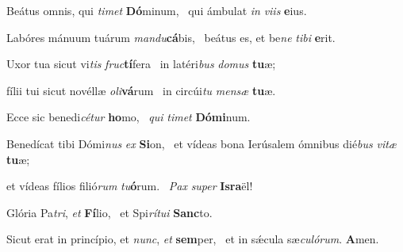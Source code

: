\item Beátus omnis, qui \textit{timet} \textbf{Dó}minum,~\psstar{} qui ámbulat \textit{in} \textit{viis} \textbf{e}ius.

\item Labóres mánuum tuárum \textit{mandu}\textbf{cá}bis,~\psstar{} beátus es, et be\textit{ne} \textit{tibi} \textbf{e}rit.

\item Uxor tua sicut vi\textit{tis} \textit{fruc}\textbf{tí}fera~\psstar{} in latéri\textit{bus} \textit{domus} \textbf{tu}æ;

\item fílii tui sicut novéllæ \textit{oli}\textbf{vá}rum~\psstar{} in circúi\textit{tu} \textit{mensæ} \textbf{tu}æ.

\item Ecce sic benedi\textit{cétur} \textbf{ho}mo,~\psstar{} \textit{qui} \textit{timet} \textbf{Dó}\textbf{mi}num.

\item Benedícat tibi Dómi\textit{nus} \textit{ex} \textbf{Si}on,~\psstar{} et vídeas bona Ierúsalem ómnibus dié\textit{bus} \textit{vitæ} \textbf{tu}æ;

\item et vídeas fílios filió\textit{rum} \textit{tu}\textbf{ó}rum.~\psstar{} \textit{Pax} \textit{super} \textbf{Is}\textbf{ra}ël!

\item Glória Pa\textit{tri}, \textit{et} \textbf{Fí}lio,~\psstar{} et Spi\textit{rítui} \textbf{Sanc}to.

\item Sicut erat in princípio, et \textit{nunc}, \textit{et} \textbf{sem}per,~\psstar{} et in sǽcula sæ\textit{culórum}. \textbf{A}men.